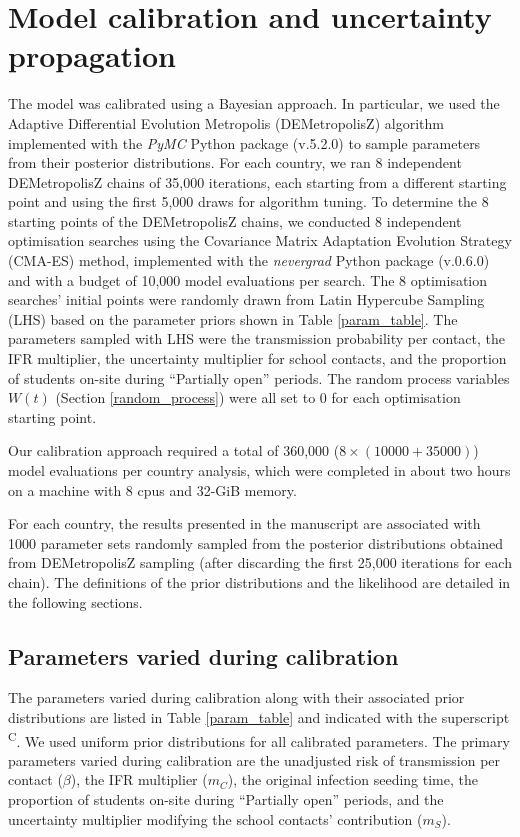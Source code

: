 \section{Model calibration and uncertainty propagation}
\label{calibration}
The model was calibrated using a Bayesian approach. In particular, we used the Adaptive Differential Evolution Metropolis 
(DEMetropolisZ) algorithm implemented with the \textit{PyMC} Python package (v.5.2.0) to sample parameters from their 
posterior distributions. For each country, we ran 8 independent DEMetropolisZ chains of 35,000 iterations, each 
starting from a different starting point and using the first 5,000 draws for algorithm tuning. 
To determine the 8 starting points of the DEMetropolisZ chains, we conducted 8 independent optimisation 
searches using the Covariance Matrix Adaptation Evolution Strategy (CMA-ES) method, implemented with the
\textit{nevergrad} Python package (v.0.6.0) and with a budget of 10,000 model evaluations per search. 
The 8 optimisation searches' initial points were randomly drawn from Latin Hypercube Sampling (LHS) based on the parameter priors shown in Table \ref{param_table}. 
The parameters sampled with LHS were the transmission probability per contact, the IFR multiplier, 
the uncertainty multiplier for school contacts, and the proportion of students on-site during “Partially open” periods. 
The random process variables $W(t)$ (Section \ref{random_process}) were all set to 0 for each optimisation starting point.

Our calibration approach required a total of 360,000 ($8 \times (10000 + 35000)$) model evaluations per country analysis, which were completed in about two hours on a machine with 8 cpus and 32-GiB memory.

For each country, the results presented in the manuscript are associated with 1000 parameter sets randomly sampled from 
the posterior distributions obtained from DEMetropolisZ sampling (after discarding the first 25,000 iterations for each chain). 
The definitions of the prior distributions and the likelihood are detailed in the following sections.

\subsection{Parameters varied during calibration}

The parameters varied during calibration along with their associated prior distributions 
are listed in Table \ref{param_table} and indicated with the superscript \textsuperscript{C}.
We used uniform prior distributions for all calibrated parameters. The primary parameters varied during calibration are 
the unadjusted risk of transmission per contact ($\beta$), the IFR multiplier ($m_C$), the original infection seeding time,
the proportion of students on-site during ``Partially open'' periods, and the uncertainty multiplier modifying the school 
contacts' contribution ($m_S$). 

